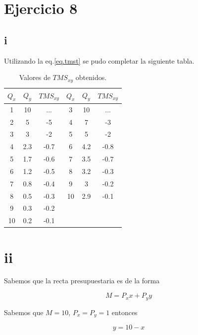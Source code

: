 \documentclass[letterpaper]{article}
\begin{document}
\section{Ejercicio 8}

\subsection*{i}

Utilizando la eq.\ref{eq.tmst} se pudo completar la siguiente tabla.

\begin{table}[htbp]
\centering
\begin{tabular}{|c|c|c||c|c|c|}
\hline $Q_x$ & $Q_y$ & $TMS_{xy}$ & $Q_x$ & $Q_y$ & $TMS_{xy}$ \\ 
\hline 1     & 10    & ...     & 3     & 10    & ...     \\
\hline 2     & 5     & -5      & 4     & 7     & -3      \\ 
\hline 3     & 3     & -2      & 5     & 5     & -2      \\ 
\hline 4     & 2.3   & -0.7    & 6     & 4.2   & -0.8    \\ 
\hline 5     & 1.7   & -0.6    & 7     & 3.5   & -0.7    \\ 
\hline 6     & 1.2   & -0.5    & 8     & 3.2   & -0.3    \\ 
\hline 7     & 0.8   & -0.4    & 9     & 3     & -0.2    \\ 
\hline 8     & 0.5   & -0.3    & 10    & 2.9   & -0.1    \\ 
\hline 9     & 0.3   & -0.2    &       &       &         \\ 
\hline 10    & 0.2   & -0.1    &       &       &         \\ 
\hline
\end{tabular}    
\caption{Valores de $TMS_{xy}$ obtenidos.}
\end{table}

\section*{ii}

Sabemos que la recta presupuestaria es de la forma

\begin{equation}
M = P_xx+P_yy
\end{equation}

Sabemos que $M=10$, $P_x=P_y=1$ entonces

\begin{equation}
y=10-x
\end{equation}
\end{document}
